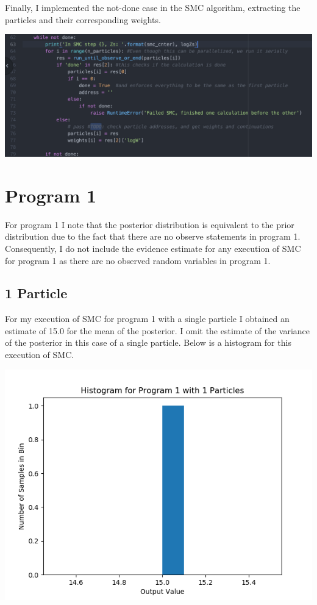 \documentclass[11pt]{article}
\theoremstyle{definition}
\begin{document}
Finally, I implemented the not-done case in the SMC algorithm, extracting the particles and their corresponding weights.

\begin{center}
\includegraphics[scale=0.5]{../implementation/return}
\end{center}



\newpage
\section{Program 1}

For program 1 I note that the posterior distribution is equivalent to the prior distribution due to the fact that there are no observe statements in program 1. Consequently, I do not include the evidence estimate for any execution of SMC for program 1 as there are no observed random variables in program 1.

\subsection{1 Particle}

For my execution of SMC for program 1 with a single particle I obtained an estimate of 15.0 for the mean of the posterior. I omit the estimate of the variance of the posterior in this case of a single particle. Below is a histogram for this execution of SMC.

\begin{center}
\includegraphics[scale=0.5]{../plots/P1NP1.png}
\end{center}
\end{document}
